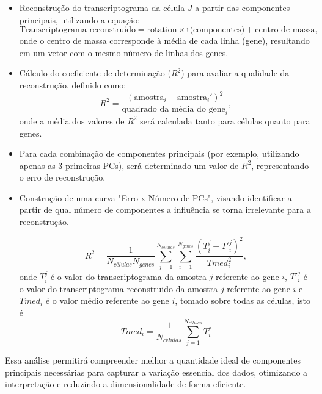 \documentclass[12pt]{article}
\begin{document}
\begin{itemize}
    \item Reconstrução do transcriptograma da célula $J$ a partir das componentes principais, utilizando a equação:
\begin{equation}
\text{Transcriptograma reconstruído} = \text{rotation} \times \text{t(componentes)} + \text{centro de massa},
\end{equation}
onde o centro de massa corresponde à média de cada linha (gene), resultando em um vetor com o mesmo número de linhas dos genes.

\item Cálculo do coeficiente de determinação ($R^2$) para avaliar a qualidade da reconstrução, definido como:
\begin{equation}
    R^2 = \frac{(\text{amostra}_i - \text{amostra}_i')^2}{\text{quadrado da média do gene}_i},
\end{equation}
onde a média dos valores de $R^2$ será calculada tanto para células quanto para genes.

\item Para cada combinação de componentes principais (por exemplo, utilizando apenas as 3 primeiras PCs), será determinado um valor de $R^2$, representando o erro de reconstrução.

\item Construção de uma curva "Erro x Número de PCs", visando identificar a partir de qual número de componentes a influência se torna irrelevante para a reconstrução.


\begin{equation}
    R^2= \frac{1}{N_{células}N_{genes}} \sum_{j=1}^{N_{células}} \sum_{i=1}^{N_{genes}} \frac{(T_i^{j}-T'_i^{j})^2}{Tmed_i^2},
\end{equation}
onde $T_i^j$ é o valor do transcriptograma da amostra $j$ referente ao gene $i$, $T'_i^j$ é o valor do transcriptograma reconstruido da amostra $j$ referente ao gene $i$ e $Tmed_i$ é o valor médio referente ao gene $i$, tomado sobre todas as células, isto é
\begin{equation}
Tmed_i= \frac{1}{N_{células}} \sum_{j=1}^{N_{células}} T_i^j
\end{equation}

\end{itemize}

Essa análise permitirá compreender melhor a quantidade ideal de componentes principais necessárias para capturar a variação essencial dos dados, otimizando a interpretação e reduzindo a dimensionalidade de forma eficiente.
\end{document}
